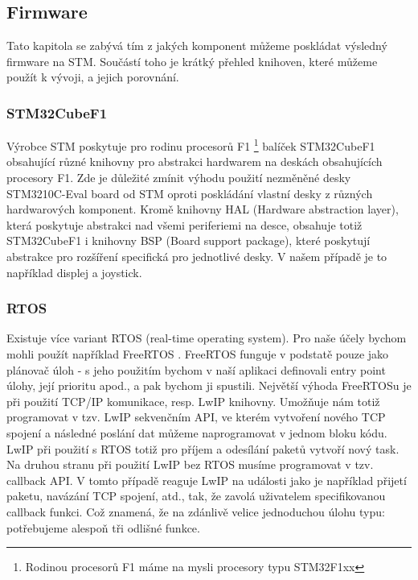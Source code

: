 \subsection{Firmware}
Tato kapitola se zabývá tím z jakých komponent můžeme poskládat výsledný firmware na STM.
Součástí toho je krátký přehled knihoven, které můžeme použít k vývoji, a jejich porovnání.

\subsubsection{STM32CubeF1}
Výrobce STM poskytuje pro rodinu procesorů F1 \footnote{Rodinou procesorů F1 máme na mysli procesory typu STM32F1xx}
balíček STM32CubeF1 \cite{STM32CubeF1} obsahující různé knihovny pro abstrakci hardwarem na deskách obsahujících procesory F1.
Zde je důležité zmínit výhodu použití nezměněné desky STM3210C-Eval board od STM oproti poskládání
vlastní desky z různých hardwarových komponent.
Kromě knihovny HAL (Hardware abstraction layer), která poskytuje abstrakci nad všemi
periferiemi na desce, obsahuje totiž STM32CubeF1 i knihovny BSP (Board support package),
které poskytují abstrakce pro rozšíření specifická pro jednotlivé desky.
V našem případě je to například displej a joystick.

\subsubsection{RTOS}
Existuje více variant RTOS (real-time operating system).
Pro naše účely bychom mohli použít například FreeRTOS \cite{FreeRTOS}.
FreeRTOS funguje v podstatě pouze jako plánovač úloh - s jeho použitím bychom v naší aplikaci
definovali entry point úlohy, její prioritu apod., a pak bychom ji spustili.
Největší výhoda FreeRTOSu je při použití TCP/IP komunikace, resp. LwIP knihovny.
Umožňuje nám totiž programovat v tzv. LwIP sekvenčním API, ve kterém vytvoření nového TCP spojení
a následné poslání dat můžeme naprogramovat v jednom bloku kódu.
LwIP při použití s RTOS totiž pro příjem a odesílání paketů vytvoří nový task.
Na druhou stranu při použití LwIP bez RTOS musíme programovat v tzv. callback API.
V tomto případě reaguje LwIP na události jako je například přijetí paketu, navázání TCP spojení, atd.,
tak, že zavolá uživatelem specifikovanou callback funkci.
Což znamená, že na zdánlivě velice jednoduchou úlohu typu: 
potřebujeme alespoň tři odlišné funkce.

